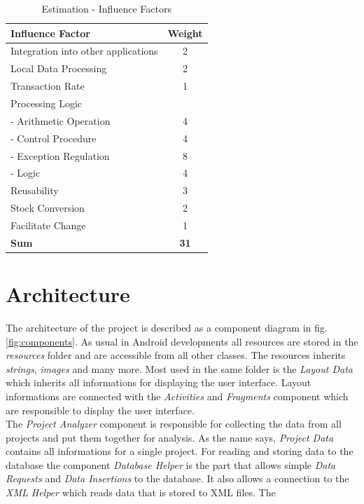 \begin{table}[h]
	\centering 
	\setlength{\tabcolsep}{4pt}
	\begin{tabular}{|l|c|}\hline
		Influence Factor						&  Weight 	\\ \hline
		Integration into other applications   	& 2      		\\ \hline
		Local Data Processing   				& 2      		\\ \hline
		Transaction Rate   						& 1      		\\ \hline
		Processing Logic   						&       		\\ \hline
		\phantom{ab}- Arithmetic Operation   					& 4      		\\ \hline
		\phantom{ab}- Control Procedure   					& 4      		\\ \hline
		\phantom{ab}- Exception Regulation   					& 8      		\\ \hline
		\phantom{ab}- Logic   								& 4      		\\ \hline
		Reusability   							& 3      		\\ \hline
		Stock Conversion  						& 2      		\\ \hline
		Facilitate Change   					& 1      		\\ \hline
		\textbf{Sum}   									& \textbf{31}      		\\ \hline
	\end{tabular} 
	\caption{Estimation - Influence Factors} 
	\label{estimation:influence} 
\end{table}

\section{Architecture}

The architecture of the project is described as a component diagram in fig. \ref{fig:components}. As usual in Android developments all resources are stored in the \textit{resources} folder and are accessible from all other classes. The resources inherits \textit{strings}, \textit{images} and many more. Most used in the same folder is the \textit{Layout Data} which inherits all informations for displaying the user interface. Layout informations are connected with the \textit{Activities} and \textit{Fragments} component which are responsible to display the user interface.\\
The \textit{Project Analyzer} component is responsible for collecting the data from all projects and put them together for analysis. As the name says, \textit{Project Data} contains all informations for a single project. For reading and storing data to the database the component \textit{Database Helper} is the part that allows simple \textit{Data Requests} and \textit{Data Insertions} to the database. It also allows a connection to the \textit{XML Helper} which reads data that is stored to XML files. The

